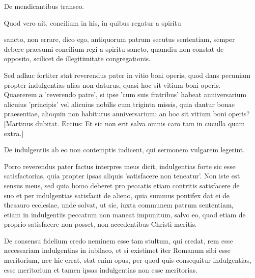 De mendicantibus transeo.

Quod vero ait, concilium in his, in quibus regatur a spiritu

sancto, non errare, dico ego, antiquorum patrum secutus sententiam, semper debere praesumi concilium regi a spiritu sancto, quamdiu non constat de opposito, scilicet de illegitimitate congregationis.

Sed adhuc fortiter stat reverendus pater in vitio boni operis, quod dans pecuniam propter indulgentias alias non daturus, quasi hoc sit vitium boni operis. Quaererem a 'reverendo patre', si ipse 'cum suis fratribus' habeat anniversarium alicuius 'principis' vel alicuius nobilis cum triginta missis, quia dantur bonae praesentiae, alioquin non habiturus anniversarium: an hoc sit vitium boni operis? [Martinus dubitat. Eccius: Et sic non erit salva omnis caro tam in cuculla quam extra.]

De indulgentiis ab eo non contemptis iudicent, qui sermonem vulgarem legerint.

Porro reverendus pater factus interpres meus dicit, indulgentias forte sic esse satisfactorias, quia propter ipsas aliquis 'satisfacere non teneatur'. Non iste est sensus meus, sed quia homo deberet pro peccatis etiam contritis satisfacere de suo et per indulgentias satisfacit de alieno, quia summus pontifex dat ei de thesauro ecclesiae, unde solvat, ut sic, iuxta communem patrum sententiam, etiam in indulgentiis peccatum non maneat impunitum, salvo eo, quod etiam de proprio satisfacere non posset, non accedentibus Christi meritis.

De consensu fidelium credo neminem esse tam stultum, qui credat, rem esse necessariam indulgentias in iubilaeo, et si existimet iter Romanum sibi esse meritorium, nec hic errat, stat enim opus, per quod quis consequitur indulgentias, esse meritorium et tamen ipsas indulgentias non esse meritorias.

